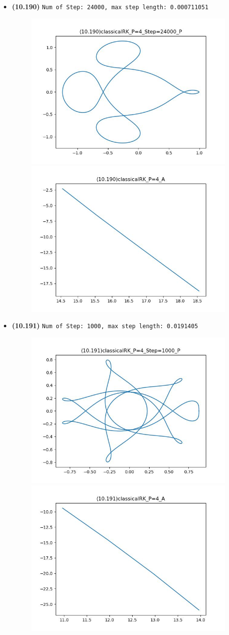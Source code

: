 \documentclass{article}
\begin{document}
\begin{itemize}
    \item \textbf{(10.190)} \verb|Num of Step: 24000, max step length: 0.000711051|
    \begin{figure}[h]
        \centering
        \includegraphics[width = 0.45\linewidth]{(10.190)classicalRK_P=4_Step=24000_P.jpg}
        \includegraphics[width = 0.45\linewidth]{(10.190)classicalRK_P=4_A.jpg}
    \end{figure}
    \newpage
    \item \textbf{(10.191)} \verb|Num of Step: 1000, max step length: 0.0191405|
    \begin{figure}[h]
        \centering
        \includegraphics[width = 0.45\linewidth]{(10.191)classicalRK_P=4_Step=1000_P.jpg}
        \includegraphics[width = 0.45\linewidth]{(10.191)classicalRK_P=4_A.jpg}
    \end{figure}
\end{itemize}
\end{document}
